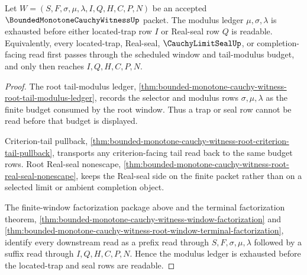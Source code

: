 \begin{theorem}
\label{thm:bounded-monotone-cauchy-witness-modulus-ledger-exhaustion}
Let $W=(S,F,\sigma,\mu,\lambda,I,Q,H,C,P,N)$ be an accepted $\BoundedMonotoneCauchyWitnessUp$ packet. The modulus ledger $\mu,\sigma,\lambda$ is exhausted before either located-trap row $I$ or Real-seal row $Q$ is readable. Equivalently, every located-trap, Real-seal, $\CauchyLimitSealUp$, or completion-facing read first passes through the scheduled window and tail-modulus budget, and only then reaches $I,Q,H,C,P,N$.
\end{theorem}
\begin{proof}
The root tail-modulus ledger, \autoref{thm:bounded-monotone-cauchy-witness-root-tail-modulus-ledger}, records the selector and modulus rows $\sigma,\mu,\lambda$ as the finite budget consumed by the root window. Thus a trap or seal row cannot be read before that budget is displayed.

Criterion-tail pullback, \autoref{thm:bounded-monotone-cauchy-witness-root-criterion-tail-pullback}, transports any criterion-facing tail read back to the same budget rows. Root Real-seal nonescape, \autoref{thm:bounded-monotone-cauchy-witness-root-real-seal-nonescape}, keeps the Real-seal side on the finite packet rather than on a selected limit or ambient completion object.

The finite-window factorization package above and the terminal factorization theorem, \autoref{thm:bounded-monotone-cauchy-witness-window-factorization} and \autoref{thm:bounded-monotone-cauchy-witness-root-window-terminal-factorization}, identify every downstream read as a prefix read through $S,F,\sigma,\mu,\lambda$ followed by a suffix read through $I,Q,H,C,P,N$. Hence the modulus ledger is exhausted before the located-trap and seal rows are readable.
\end{proof}

